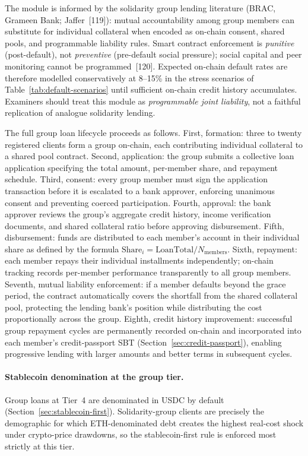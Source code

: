 \documentclass[12pt,a4paper]{report}
\begin{document}
The module is informed by the solidarity group lending literature (BRAC, Grameen Bank; Jaffer~[119]): mutual accountability among group members can substitute for individual collateral when encoded as on-chain consent, shared pools, and programmable liability rules. Smart contract enforcement is \textit{punitive} (post-default), not \textit{preventive} (pre-default social pressure); social capital and peer monitoring cannot be programmed~[120]. Expected on-chain default rates are therefore modelled conservatively at 8--15\% in the stress scenarios of Table~\ref{tab:default-scenarios} until sufficient on-chain credit history accumulates. Examiners should treat this module as \textit{programmable joint liability}, not a faithful replication of analogue solidarity lending.

The full group loan lifecycle proceeds as follows. First, formation: three to twenty registered clients form a group on-chain, each contributing individual collateral to a shared pool contract. Second, application: the group submits a collective loan application specifying the total amount, per-member share, and repayment schedule. Third, consent: every group member must sign the application transaction before it is escalated to a bank approver, enforcing unanimous consent and preventing coerced participation. Fourth, approval: the bank approver reviews the group's aggregate credit history, income verification documents, and shared collateral ratio before approving disbursement. Fifth, disbursement: funds are distributed to each member's account in their individual share as defined by the formula \(\text{Share}_i = \text{LoanTotal} / N_{\text{members}}\). Sixth, repayment: each member repays their individual installments independently; on-chain tracking records per-member performance transparently to all group members. Seventh, mutual liability enforcement: if a member defaults beyond the grace period, the contract automatically covers the shortfall from the shared collateral pool, protecting the lending bank's position while distributing the cost proportionally across the group. Eighth, credit history improvement: successful group repayment cycles are permanently recorded on-chain and incorporated into each member's credit-passport SBT (Section~\ref{sec:credit-passport}), enabling progressive lending with larger amounts and better terms in subsequent cycles.

\paragraph{Stablecoin denomination at the group tier.}
Group loans at Tier~4 are denominated in USDC by default (Section~\ref{sec:stablecoin-first}). Solidarity-group clients are precisely the demographic for which ETH-denominated debt creates the highest real-cost shock under crypto-price drawdowns, so the stablecoin-first rule is enforced most strictly at this tier.
\end{document}

